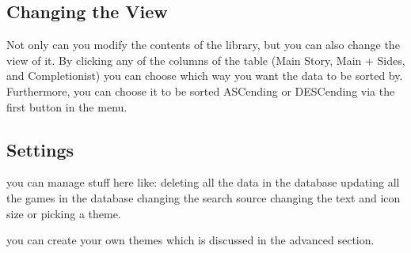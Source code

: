 
\subsection{Changing the View}

Not only can you modify the contents of the library, but you can also
change the view of it.
By clicking any of the columns of the table (Main Story, Main +
Sides, and Completionist) you can choose which way you want the data
to be sorted by. Furthermore, you can choose it to be sorted
ASCending or DESCending via the first button in the menu.



\subsection{Settings}

you can manage stuff here like:
deleting all the data in the database
updating all the games in the database
changing the search source
changing the text and icon size
or picking a theme.

you can create your own themes which is discussed in the advanced section.
